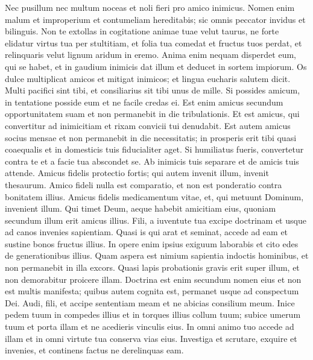 \begin{biblechapter}  
\verse Nec pusillum nec multum noceas et noli fieri pro amico inimicus. Nomen enim malum et improperium et contumeliam hereditabis; sic omnis peccator invidus et bilinguis. 
\verse Non te extollas in cogitatione animae tuae velut taurus, ne forte elidatur virtus tua per stultitiam, 
\verse et folia tua comedat et fructus tuos perdat, et relinquaris velut lignum aridum in eremo. 
\verse Anima enim nequam disperdet eum, qui se habet, et in gaudium inimicis dat illum et deducet in sortem impiorum. 
\verse Os dulce multiplicat amicos et mitigat inimicos; et lingua eucharis salutem dicit. 
\verse Multi pacifici sint tibi, et consiliarius sit tibi unus de mille. 
\verse Si possides amicum, in tentatione posside eum et ne facile credas ei. 
\verse Est enim amicus secundum opportunitatem suam et non permanebit in die tribulationis. 
\verse Et est amicus, qui convertitur ad inimicitiam et rixam convicii tui denudabit. 
\verse Est autem amicus socius mensae et non permanebit in die necessitatis; 
\verse in prosperis erit tibi quasi coaequalis et in domesticis tuis fiducialiter aget. 
\verse Si humiliatus fueris, convertetur contra te et a facie tua abscondet se. 
\verse Ab inimicis tuis separare et de amicis tuis attende. 
\verse Amicus fidelis protectio fortis; qui autem invenit illum, invenit thesaurum. 
\verse Amico fideli nulla est comparatio, et non est ponderatio contra bonitatem illius. 
\verse Amicus fidelis medicamentum vitae, et, qui metuunt Dominum, invenient illum. 
\verse Qui timet Deum, aeque habebit amicitiam eius, quoniam secundum illum erit amicus illius. 
\verse Fili, a iuventute tua excipe doctrinam et usque ad canos invenies sapientiam. 
\verse Quasi is qui arat et seminat, accede ad eam et sustine bonos fructus illius. 
\verse In opere enim ipsius exiguum laborabis et cito edes de generationibus illius. 
\verse Quam aspera est nimium sapientia indoctis hominibus, et non permanebit in illa excors. 
\verse Quasi lapis probationis gravis erit super illum, et non demorabitur proicere illam. 
\verse Doctrina est enim secundum nomen eius et non est multis manifesta; quibus autem cognita est, permanet usque ad conspectum Dei. 
\verse Audi, fili, et accipe sententiam meam et ne abicias consilium meum. 
\verse Inice pedem tuum in compedes illius et in torques illius collum tuum; 
\verse subice umerum tuum et porta illam et ne acedieris vinculis eius. 
\verse In omni animo tuo accede ad illam et in omni virtute tua conserva vias eius. 
\verse Investiga et scrutare, exquire et invenies, et continens factus ne derelinquas eam. 

\end{biblechapter}
